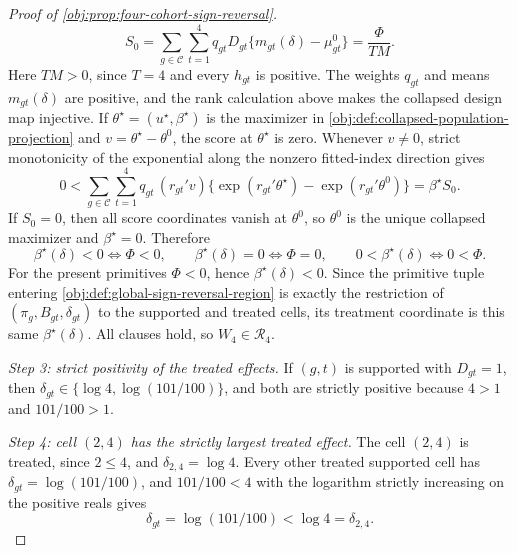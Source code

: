 \documentclass[11pt]{article}
\begin{document}
\begin{proof}[Proof of \cref{obj:prop:four-cohort-sign-reversal}]
\[
S_0
=
\sum_{g\in\mathcal C}\sum_{t=1}^4
q_{gt}D_{gt}\{m_{gt}(\delta)-\mu^0_{gt}\}
=
\frac{\Phi}{T M} .
\]
Here \(TM>0\), since \(T=4\) and every \(h_{gt}\) is positive. The weights \(q_{gt}\) and means \(m_{gt}(\delta)\) are positive, and the rank calculation above makes the collapsed design map injective. If \(\theta^\star=(u^\star,\beta^\star)\) is the maximizer in \cref{obj:def:collapsed-population-projection} and \(v=\theta^\star-\theta^0\), the score at \(\theta^\star\) is zero. Whenever \(v\neq0\), strict monotonicity of the exponential along the nonzero fitted-index direction gives
\[
0<
\sum_{g\in\mathcal C}\sum_{t=1}^4
q_{gt}\,(r_{gt}'v)\{\exp(r_{gt}'\theta^\star)-\exp(r_{gt}'\theta^0)\}
=\beta^\star S_0 .
\]
If \(S_0=0\), then all score coordinates vanish at \(\theta^0\), so \(\theta^0\) is the unique collapsed maximizer and \(\beta^\star=0\). Therefore
\[
\beta^\star(\delta)<0\iff\Phi<0,
\qquad
\beta^\star(\delta)=0\iff\Phi=0,
\qquad
0<\beta^\star(\delta)\iff0<\Phi .
\]
For the present primitives \(\Phi<0\), hence \(\beta^\star(\delta)<0\).
Since the primitive tuple entering \cref{obj:def:global-sign-reversal-region} is exactly the restriction of \((\pi_g,B_{gt},\delta_{gt})\) to the supported and treated cells, its treatment coordinate is this same \(\beta^\star(\delta)\). All clauses hold, so \(W_4\in\mathcal R_4\).

\textit{Step 3: strict positivity of the treated effects.} If \((g,t)\) is supported with \(D_{gt}=1\), then \(\delta_{gt}\in\{\log 4,\log(101/100)\}\), and both are strictly positive because \(4>1\) and \(101/100>1\).

\textit{Step 4: cell \((2,4)\) has the strictly largest treated effect.} The cell \((2,4)\) is treated, since \(2\le 4\), and \(\delta_{2,4}=\log4\). Every other treated supported cell has \(\delta_{gt}=\log(101/100)\), and \(101/100<4\) with the logarithm strictly increasing on the positive reals gives
\[
\delta_{gt}=\log(101/100)<\log4=\delta_{2,4}.
\]


\end{proof}
\end{document}
